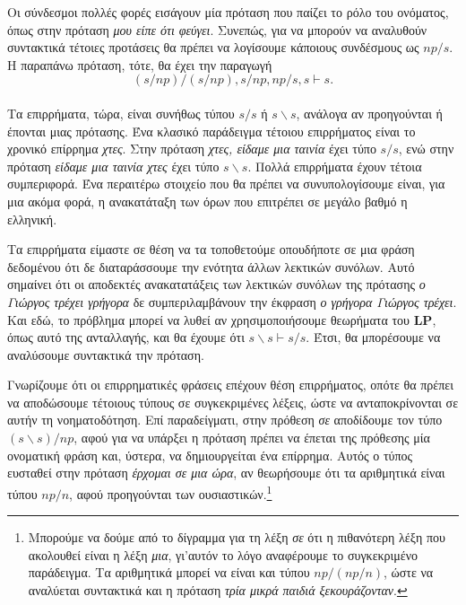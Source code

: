\documentclass [a4paper,11pt] {book}
\theoremstyle{definition}
\theoremstyle{definition}
\begin{document}
Οι σύνδεσμοι πολλές φορές εισάγουν μία πρόταση που παίζει το ρόλο του ονόματος, όπως στην πρόταση \textit{μου είπε ότι φεύγει}. Συνεπώς, για να μπορούν να αναλυθούν συντακτικά τέτοιες προτάσεις θα πρέπει να λογίσουμε κάποιους συνδέσμους ως $np/s$. Η παραπάνω πρόταση, τότε, θα έχει την παραγωγή
\begin{equation*}
(s/np)/(s/np), s/np, np/s, s\vdash s.
\end{equation*}
\paragraph{}
Τα επιρρήματα, τώρα, είναι συνήθως τύπου $s/s$ ή $s\backslash s$, ανάλογα αν προηγούνται ή έπονται μιας πρότασης. Ένα κλασικό παράδειγμα τέτοιου επιρρήματος είναι το χρονικό επίρρημα \textit{χτες}. Στην πρόταση \textit{χτες, είδαμε μια ταινία} έχει τύπο $s/s$, ενώ στην πρόταση \textit{είδαμε μια ταινία χτες} έχει τύπο $s\backslash s$. Πολλά επιρρήματα έχουν τέτοια συμπεριφορά. Ένα περαιτέρω στοιχείο που θα πρέπει να συνυπολογίσουμε είναι, για μια ακόμα φορά, η ανακατάταξη των όρων που επιτρέπει σε μεγάλο βαθμό η ελληνική.

Τα επιρρήματα είμαστε σε θέση να τα τοποθετούμε οπουδήποτε σε μια φράση δεδομένου ότι δε διαταράσσουμε την ενότητα άλλων λεκτικών συνόλων. Αυτό σημαίνει ότι οι αποδεκτές ανακατατάξεις των λεκτικών συνόλων της πρότασης \textit{ο Γιώργος τρέχει γρήγορα} δε συμπεριλαμβάνουν την έκφραση \textit{ο γρήγορα Γιώργος τρέχει}. Και εδώ, το πρόβλημα μπορεί να λυθεί αν χρησιμοποιήσουμε θεωρήματα του \textbf{LP}, όπως αυτό της ανταλλαγής, και θα έχουμε ότι $s\backslash s \vdash s/s$. Έτσι, θα μπορέσουμε να αναλύσουμε συντακτικά την πρόταση.

Γνωρίζουμε ότι οι επιρρηματικές φράσεις επέχουν θέση επιρρήματος, οπότε θα πρέπει να αποδώσουμε τέτοιους τύπους σε συγκεκριμένες λέξεις, ώστε να ανταποκρίνονται σε αυτήν τη νοηματοδότηση. Επί παραδείγματι, στην πρόθεση \textit{σε} αποδίδουμε τον τύπο $(s\backslash s)/np$, αφού για να υπάρξει η πρόταση πρέπει να έπεται της πρόθεσης μία ονοματική φράση και, ύστερα, να δημιουργείται ένα επίρρημα. Αυτός ο τύπος ευσταθεί στην πρόταση \textit{έρχομαι σε μια ώρα}, αν θεωρήσουμε ότι τα αριθμητικά είναι τύπου $np/n$, αφού προηγούνται των ουσιαστικών.\footnote{Μπορούμε να δούμε από το δίγραμμα για τη λέξη \textit{σε} ότι η πιθανότερη λέξη που ακολουθεί είναι η λέξη \textit{μια}, γι'αυτόν το λόγο αναφέρουμε το συγκεκριμένο παράδειγμα. Τα αριθμητικά μπορεί να είναι και τύπου $np/(np/n)$, ώστε να αναλύεται συντακτικά και η πρόταση \textit{τρία μικρά παιδιά ξεκουράζονταν}.}
\end{document}
